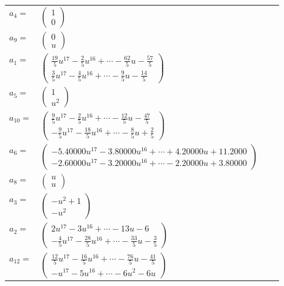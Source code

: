 \documentclass[1p]{elsarticle_modified}
\theoremstyle{definition}
\begin{document}
\begin{tabular}{m{7pt} m{180pt} m{7pt} m{180pt} }
\flushright $a_{4}=$&$\begin{pmatrix}1\\0\end{pmatrix}$ \\
\flushright $a_{9}=$&$\begin{pmatrix}0\\u\end{pmatrix}$ \\
\flushright $a_{1}=$&$\begin{pmatrix}\frac{19}{5} u^{17}-\frac{2}{5} u^{16}+\cdots-\frac{62}{5} u-\frac{57}{5}\\\frac{3}{5} u^{17}-\frac{4}{5} u^{16}+\cdots-\frac{9}{5} u-\frac{14}{5}\end{pmatrix}$ \\
\flushright $a_{5}=$&$\begin{pmatrix}1\\u^2\end{pmatrix}$ \\
\flushright $a_{10}=$&$\begin{pmatrix}\frac{9}{5} u^{17}-\frac{2}{5} u^{16}+\cdots-\frac{12}{5} u-\frac{47}{5}\\-\frac{9}{5} u^{17}-\frac{18}{5} u^{16}+\cdots-\frac{8}{5} u+\frac{2}{5}\end{pmatrix}$ \\
\flushright $a_{6}=$&$\begin{pmatrix}-5.40000 u^{17}-3.80000 u^{16}+\cdots+4.20000 u+11.2000\\-2.60000 u^{17}-3.20000 u^{16}+\cdots-2.20000 u+3.80000\end{pmatrix}$ \\
\flushright $a_{8}=$&$\begin{pmatrix}u\\u\end{pmatrix}$ \\
\flushright $a_{3}=$&$\begin{pmatrix}- u^2+1\\- u^2\end{pmatrix}$ \\
\flushright $a_{2}=$&$\begin{pmatrix}2 u^{17}-3 u^{16}+\cdots-13 u-6\\-\frac{4}{5} u^{17}-\frac{28}{5} u^{16}+\cdots-\frac{33}{5} u-\frac{3}{5}\end{pmatrix}$ \\
\flushright $a_{12}=$&$\begin{pmatrix}\frac{12}{5} u^{17}-\frac{16}{5} u^{16}+\cdots-\frac{76}{5} u-\frac{41}{5}\\- u^{17}-5 u^{16}+\cdots-6 u^2-6 u\end{pmatrix}$ \\

\end{tabular}
\end{document}
